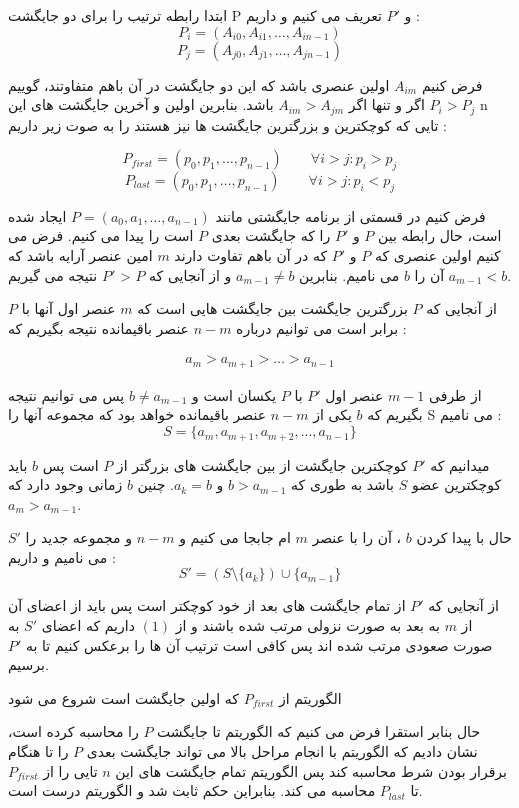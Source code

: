\documentclass[]{article}
\begin{document}
ابتدا رابطه ترتیب را برای دو جایگشت P و $P'$
تعریف می کنیم و داریم :
$$P_i = (A_{i0}, A_{i1}, \ldots, A_{in-1})$$
$$P_j = (A_{j0}, A_{j1}, \ldots, A_{jn-1})$$

فرض کنیم $A_{im}$
اولین عنصری باشد که این دو جایگشت در آن باهم متفاوتند، گوییم $P_i > P_j$ اگر و تنها اگر $A_{im} > A_{jm}$ باشد.
بنابرین اولین و آخرین جایگشت های این n تایی که کوچکترین و بزرگترین جایگشت ها نیز هستند را به صوت زیر داریم :

$$P_{first} = (p_0, p_1, \ldots, p_{n-1})  \hspace{2em} \forall i > j : p_i > p_j $$
$$P_{last} = (p_0, p_1, \ldots, p_{n-1})  \hspace{2em} \forall i > j : p_i < p_j $$

فرض کنیم در قسمتی از برنامه جایگشتی مانند $P = (a_0, a_1, \ldots, a_{n-1})$ ایجاد شده است،
حال رابطه بین $P$ و $P'$ را که جایگشت بعدی $P$ است را پیدا می کنیم.
فرض می کنیم اولین عنصری که $P$ و $P'$ که در آن باهم تفاوت دارند 
$m$ امین عنصر آرایه باشد که آن را $b$ می نامیم.
بنابرین $a_{m-1} \not = b$ و از آنجایی که $P$ < $P'$ نتیجه می گیریم $a_{m-1} < b$.

از آنجایی که $P$ بزرگترین جایگشت بین جایگشت هایی است که $m$ عنصر اول آنها با $P$ برابر است
می توانیم درباره $n - m$ عنصر باقیمانده نتیجه بگیریم که :

    \begin{align}
        a_m > a_{m+1} > \ldots > a_{n-1}
    \end{align}

از طرفی $ m - 1$ عنصر اول $P'$ با $P$ یکسان است و 
$ b \not = a_{m-1}$ پس می توانیم نتیجه بگیریم که $b$ یکی از $n-m$ عنصر باقیمانده خواهد بود
که مجموعه آنها را S می نامیم :
$$ S = \{a_m, a_{m+1}, a_{m+2}, ..., a_{n-1}\}$$

میدانیم که $P'$ کوچکترین جایگشت از بین جایگشت های بزرگتر از $P$ است
پس $b$ باید کوچکترین عضو $S$ باشد به طوری که $b > a_{m-1}$ و $a_k = b$.
چنین $b$ زمانی وجود دارد که $a_m > a_{m-1}$.

حال با پیدا کردن $b$ ، آن را با عنصر $m$ ام جابجا می کنیم و $n - m$
و مجموعه جدید را $S'$ می نامیم و داریم :
$$S' = (S \setminus \{a_k\}) \cup \{a_{m-1}\}$$

از آنجایی که $P'$ از تمام جایگشت های بعد از خود کوچکتر است پس باید از اعضای آن از $m$ به بعد به صورت نزولی مرتب شده باشند
و از $(1)$ داریم که اعضای $S'$ به صورت صعودی مرتب شده اند پس کافی است ترتیب آن ها را برعکس کنیم تا به $P'$ برسیم.

الگوریتم از $P_{first}$ که اولین جایگشت است شروع می شود

حال بنابر استقرا فرض می کنیم که الگوریتم تا جایگشت $P$ را محاسبه کرده است، نشان دادیم که الگوریتم با انجام مراحل بالا 
می تواند جایگشت بعدی $P$ را تا هنگام برقرار بودن شرط
محاسبه کند پس الگوریتم تمام جایگشت های این $n$ تایی را از
$P_{first}$ تا $P_{last}$ محاسبه می کند. بنابراین حکم ثابت شد و الگوریتم درست است.
\end{document}
